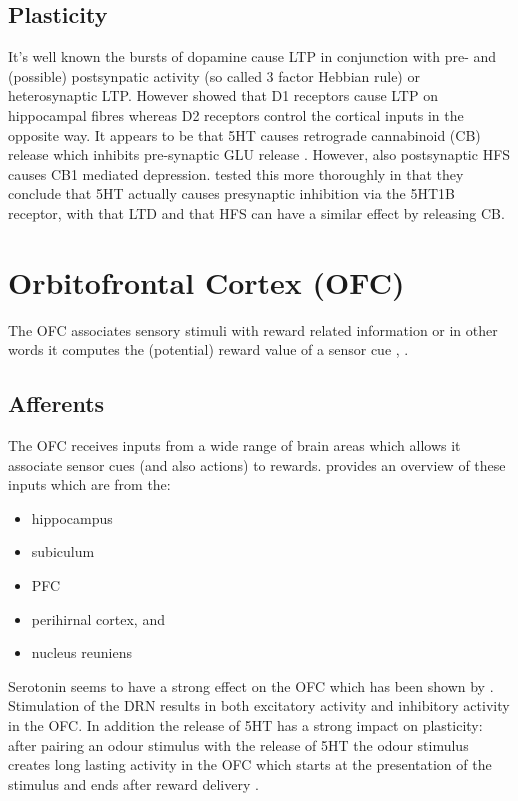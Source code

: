 \documentclass[12pt,a4paper]{article}
\let\oldsection\section
\renewcommand\section{\clearpage\oldsection}
\begin{document}
\subsection{Plasticity}

It's well known the bursts of dopamine cause LTP in conjunction with pre- and (possible) postsynpatic activity (so called 3 factor Hebbian rule) or heterosynaptic LTP. However \citep{Goto2005} showed that D1 receptors cause LTP on hippocampal fibres whereas D2 receptors control the cortical inputs in the opposite way.
It appears to be that 5HT causes retrograde cannabinoid (CB) release which inhibits pre-synaptic GLU release \citep{Burattini2014}. However, also postsynaptic HFS causes CB1 mediated depression. \citep{Mathur2011} tested this more thoroughly in that they conclude that 5HT actually causes presynaptic inhibition via the 5HT1B receptor, with that LTD and that HFS can have a similar effect by releasing CB.



\section{Orbitofrontal Cortex (OFC)}

The OFC associates sensory stimuli with reward related information \citep{Schoenbaum.2009} or in other words it computes the (potential) reward value of a sensor cue \citep{Wikenheiser2016}, \citep{Bari2013}.

\subsection{Afferents}

The OFC receives inputs from a wide range of brain areas which allows it associate sensor cues (and also actions) to rewards. \citep{Wikenheiser2016} provides an overview of these inputs which are from the:

\begin{itemize}
\item hippocampus
\item subiculum
\item PFC
\item perihirnal cortex, and
\item nucleus reuniens
\end{itemize}

Serotonin seems to have a strong effect on the OFC which has been shown by \citep{Zhou2015}. Stimulation of the DRN results in both excitatory activity and inhibitory activity in the OFC. In addition the release of 5HT has a strong impact on plasticity: after pairing an odour stimulus with the release of 5HT the odour stimulus creates long lasting activity in the OFC which starts at the presentation of the stimulus and ends after reward delivery  \citep{Zhou2015}.
\end{document}
